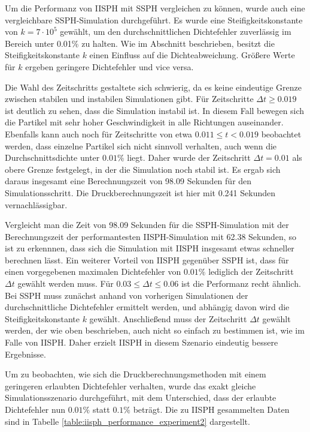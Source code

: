 \documentclass[11pt,
a4paper,
parskip=half, %
BCOR=10mm, %
english,
ngerman]{scrreprt}
\begin{document}
Um die Performanz von IISPH mit SSPH vergleichen zu können, wurde auch eine vergleichbare SSPH-Simulation durchgeführt.
Es wurde eine Steifigkeitskonstante von $k = 7 \cdot 10^5$ gewählt, um den durchschnittlichen Dichtefehler zuverlässig im Bereich unter 0.01\% zu halten.
Wie im Abschnitt \textit{} beschrieben,
besitzt die Steifigkeitskonstante $k$ einen Einfluss auf die Dichteabweichung.
Größere Werte für $k$ ergeben geringere Dichtefehler und vice versa.

Die Wahl des Zeitschritts gestaltete sich schwierig, da es keine eindeutige Grenze zwischen stabilen und instabilen Simulationen gibt.
Für Zeitschritte $\Delta t \geq 0.019$ ist deutlich zu sehen, dass die Simulation instabil ist.
In diesem Fall bewegen sich die Partikel mit sehr hoher Geschwindigkeit in alle Richtungen auseinander.
Ebenfalls kann auch noch für Zeitschritte von etwa $0.011 \leq t < 0.019$ beobachtet werden, dass einzelne Partikel sich nicht sinnvoll verhalten,
auch wenn die Durchschnittsdichte unter $0.01\%$ liegt.
Daher wurde der Zeitschritt $\Delta t = 0.01$ als obere Grenze festgelegt, in der die Simulation noch stabil ist.
Es ergab sich daraus insgesamt eine Berechnungszeit von 98.09 Sekunden für den Simulationsschritt.
Die Druckberechnungszeit ist hier mit 0.241 Sekunden vernachlässigbar.

Vergleicht man die Zeit von 98.09 Sekunden für die SSPH-Simulation mit der Berechnungszeit der performantesten IISPH-Simulation mit 62.38 Sekunden,
so ist zu erkennnen, dass sich die Simulation mit IISPH insgesamt etwas schneller berechnen lässt.
Ein weiterer Vorteil von IISPH gegenüber SSPH ist,
dass für einen vorgegebenen maximalen Dichtefehler von $0.01 \%$ lediglich der Zeitschritt $\Delta t$ gewählt werden muss.
Für $0.03 \leq \Delta t \leq 0.06$ ist die Performanz recht ähnlich.
Bei SSPH muss zunächst anhand von vorherigen Simulationen der durchschnittliche Dichtefehler ermittelt werden,
und abhängig davon wird die Steifigkeitskonstante $k$ gewählt.
Anschließend muss der Zeitschritt $\Delta t$ gewählt werden, der wie oben beschrieben, auch nicht so einfach zu bestimmen ist, wie im Falle von IISPH.
Daher erzielt IISPH in diesem Szenario eindeutig bessere Ergebnisse.


Um zu beobachten, wie sich die Druckberechnungsmethoden mit einem geringeren erlaubten Dichtefehler verhalten,
wurde das exakt gleiche Simulationsszenario durchgeführt, mit dem Unterschied, dass der erlaubte Dichtefehler nun $0.01 \%$ statt $0.1 \%$ beträgt.
Die zu IISPH gesammelten Daten sind in Tabelle \ref{table:iisph_performance_experiment2} dargestellt.
\end{document}
